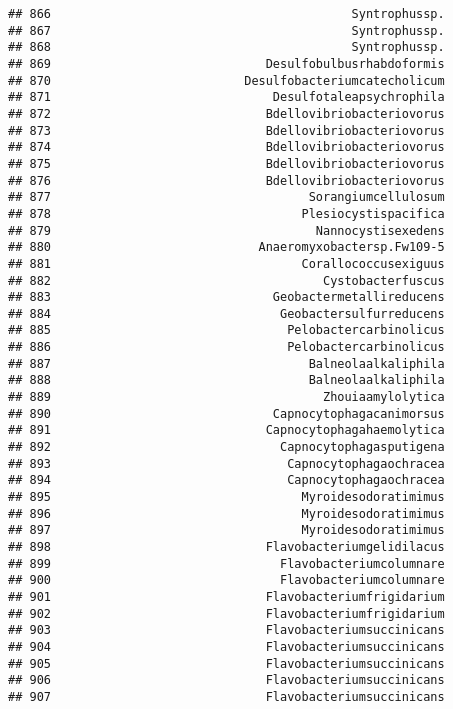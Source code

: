\documentclass[
]{article}
\begin{document}
\begin{verbatim}
## 866                                          Syntrophussp.
## 867                                          Syntrophussp.
## 868                                          Syntrophussp.
## 869                              Desulfobulbusrhabdoformis
## 870                           Desulfobacteriumcatecholicum
## 871                               Desulfotaleapsychrophila
## 872                              Bdellovibriobacteriovorus
## 873                              Bdellovibriobacteriovorus
## 874                              Bdellovibriobacteriovorus
## 875                              Bdellovibriobacteriovorus
## 876                              Bdellovibriobacteriovorus
## 877                                    Sorangiumcellulosum
## 878                                   Plesiocystispacifica
## 879                                     Nannocystisexedens
## 880                             Anaeromyxobactersp.Fw109-5
## 881                                   Corallococcusexiguus
## 882                                      Cystobacterfuscus
## 883                               Geobactermetallireducens
## 884                                Geobactersulfurreducens
## 885                                 Pelobactercarbinolicus
## 886                                 Pelobactercarbinolicus
## 887                                    Balneolaalkaliphila
## 888                                    Balneolaalkaliphila
## 889                                      Zhouiaamylolytica
## 890                               Capnocytophagacanimorsus
## 891                              Capnocytophagahaemolytica
## 892                                Capnocytophagasputigena
## 893                                 Capnocytophagaochracea
## 894                                 Capnocytophagaochracea
## 895                                   Myroidesodoratimimus
## 896                                   Myroidesodoratimimus
## 897                                   Myroidesodoratimimus
## 898                              Flavobacteriumgelidilacus
## 899                                Flavobacteriumcolumnare
## 900                                Flavobacteriumcolumnare
## 901                              Flavobacteriumfrigidarium
## 902                              Flavobacteriumfrigidarium
## 903                              Flavobacteriumsuccinicans
## 904                              Flavobacteriumsuccinicans
## 905                              Flavobacteriumsuccinicans
## 906                              Flavobacteriumsuccinicans
## 907                              Flavobacteriumsuccinicans

\end{verbatim}
\end{document}
